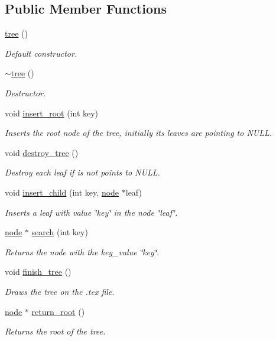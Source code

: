 \subsection*{Public Member Functions}
\begin{DoxyCompactItemize}
\item 
\hyperlink{classtree_a9f2a566ac2710fafc31232456780e82d}{tree} ()
\begin{DoxyCompactList}\small\item\em Default constructor. \end{DoxyCompactList}\item 
\hyperlink{classtree_a05f3faa3c9a8f6fed237e2d0f6172244}{$\sim$tree} ()
\begin{DoxyCompactList}\small\item\em Destructor. \end{DoxyCompactList}\item 
void \hyperlink{classtree_acbfbccebf3d8482cb6a1a878ab99491f}{insert\-\_\-root} (int key)
\begin{DoxyCompactList}\small\item\em Inserts the root node of the tree, initially its leaves are pointing to N\-U\-L\-L. \end{DoxyCompactList}\item 
void \hyperlink{classtree_a523172b004801388b1e6920d6d984347}{destroy\-\_\-tree} ()
\begin{DoxyCompactList}\small\item\em Destroy each leaf if is not points to N\-U\-L\-L. \end{DoxyCompactList}\item 
void \hyperlink{classtree_adebed7ad744b6db3354bfdc9a6713143}{insert\-\_\-child} (int key, \hyperlink{structnode}{node} $\ast$leaf)
\begin{DoxyCompactList}\small\item\em Inserts a leaf with value \char`\"{}key\char`\"{} in the node \char`\"{}leaf\char`\"{}. \end{DoxyCompactList}\item 
\hyperlink{structnode}{node} $\ast$ \hyperlink{classtree_a9a4e341c78d3559e5f6e3b0060530f05}{search} (int key)
\begin{DoxyCompactList}\small\item\em Returns the node with the key\-\_\-value \char`\"{}key\char`\"{}. \end{DoxyCompactList}\item 
void \hyperlink{classtree_a86bf515529211e7f7d1f18892bf6fff5}{finish\-\_\-tree} ()
\begin{DoxyCompactList}\small\item\em Draws the tree on the .tex file. \end{DoxyCompactList}\item 
\hyperlink{structnode}{node} $\ast$ \hyperlink{classtree_a4fe0fb0307507a56395a377d2166d4d2}{return\-\_\-root} ()
\begin{DoxyCompactList}\small\item\em Returns the root of the tree. \end{DoxyCompactList}\end{DoxyCompactItemize}
